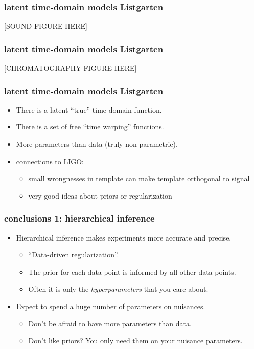 \documentclass[pdftex]{beamer}
\begin{document}
\begin{frame}
  \frametitle{latent time-domain models {\small Listgarten \etal}}
  [SOUND FIGURE HERE]
\end{frame}

\begin{frame}
  \frametitle{latent time-domain models {\small Listgarten \etal}}
  [CHROMATOGRAPHY FIGURE HERE]
\end{frame}

\begin{frame}
  \frametitle{latent time-domain models {\small Listgarten \etal}}
  \begin{itemize}
  \item There is a latent ``true'' time-domain function.
  \item There is a set of free ``time warping'' functions.
  \item More parameters than data (truly non-parametric).
  \item connections to LIGO:
    \begin{itemize}
    \item small wrongnesses in template can make template orthogonal to signal
    \item very good ideas about priors or regularization
    \end{itemize}
  \end{itemize}
\end{frame}

\begin{frame}
  \frametitle{conclusions 1: hierarchical inference}
  \begin{itemize}
  \item Hierarchical inference makes experiments more accurate and precise.
    \begin{itemize}
    \item ``Data-driven regularization''.
    \item The prior for each data point is informed by all other data points.
    \item Often it is only the \emph{hyperparameters} that you care about.
    \end{itemize}
  \item Expect to spend a huge number of parameters on nuisances.
    \begin{itemize}
    \item Don't be afraid to have more parameters than data.
    \item Don't like priors?  You only need them on your nuisance parameters.
    \end{itemize}
  \end{itemize}
\end{frame}
\end{document}
